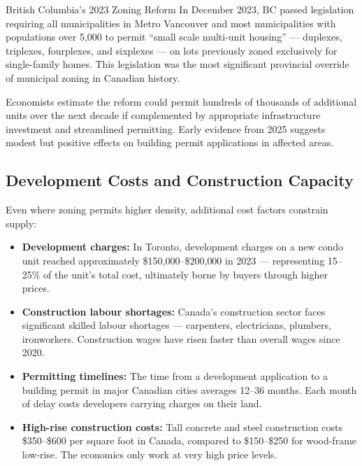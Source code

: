 \begin{canexample}{British Columbia's 2023 Zoning Reform}
In December 2023, BC passed legislation requiring all municipalities in
Metro Vancouver and most municipalities with populations over 5{,}000 to
permit ``small scale multi-unit housing'' --- duplexes, triplexes,
fourplexes, and sixplexes --- on lots previously zoned exclusively for
single-family homes. This  legislation was the most
significant provincial override of municipal zoning in Canadian history.

Economists estimate the reform could permit hundreds of thousands of
additional units over the next decade if complemented by appropriate
infrastructure investment and streamlined permitting. Early evidence
from 2025 suggests modest but positive effects on building permit
applications in affected areas.
\end{canexample}

\subsection{Development Costs and Construction Capacity}

Even where zoning permits higher density, additional cost factors constrain supply:

\begin{itemize}
  \item \textbf{Development charges:} In Toronto, development charges
        on a new condo unit reached approximately \$150{,}000--\$200{,}000
        in 2023 --- representing 15--25\% of the unit's total cost, ultimately
        borne by buyers through higher prices.

  \item \textbf{Construction labour shortages:} Canada's construction sector
        faces significant skilled labour shortages --- carpenters, electricians,
        plumbers, ironworkers. Construction wages have risen faster than
        overall wages since 2020.

  \item \textbf{Permitting timelines:} The time from a development application
        to a building permit in major Canadian cities averages 12--36 months.
        Each month of delay costs developers carrying charges on their land.

  \item \textbf{High-rise construction costs:} Tall concrete and steel
        construction costs \$350--\$600 per square foot in Canada, compared
        to \$150--\$250 for wood-frame low-rise. The economics only work
        at very high price levels.
\end{itemize}

